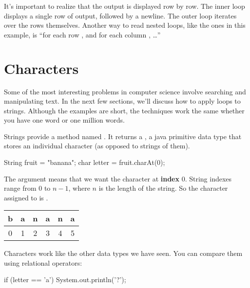 It's important to realize that the output is displayed row by row.
The inner loop displays a single row of output, followed by a newline.
The outer loop iterates over the rows themselves.
Another way to read nested loops, like the ones in this example, is ``for each row , and for each column , \ldots''


\section{Characters}

Some of the most interesting problems in computer science involve searching and manipulating text.
In the next few sections, we'll discuss how to apply loops to strings.
Although the examples are short, the techniques work the same whether you have one word or one million words.


Strings provide a method named .
It returns a , a java primitive data type that stores an individual character (as opposed to strings of them).

\begin{code}
String fruit = "banana";
char letter = fruit.charAt(0);
\end{code}

The argument  means that we want the character at {\bf index} 0.
String indexes range from 0 to $n-1$, where $n$ is the length of the string.
So the character assigned to  is .

\begin{center}
\ttfamily
\begin{tabular}{cccccc}
\hline
\multicolumn{1}{|l|}{b} & \multicolumn{1}{l|}{a} & \multicolumn{1}{l|}{n} & \multicolumn{1}{l|}{a} & \multicolumn{1}{l|}{n} & \multicolumn{1}{l|}{a} \\ \hline
0                       & 1                      & 2                      & 3                      & 4                      & 5
\end{tabular}
\end{center}


Characters work like the other data types we have seen.
You can compare them using relational operators:

\begin{code}
if (letter == 'a') {
    System.out.println('?');
}
\end{code}

